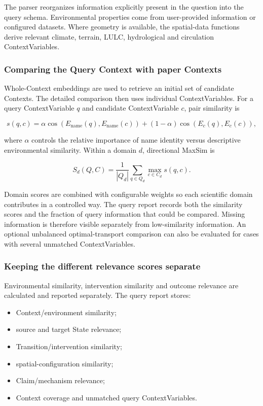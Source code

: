\documentclass[10pt,twocolumn]{article}
\begin{document}
The parser reorganizes information explicitly present in the question into the query schema. Environmental properties come from user-provided information or configured datasets. Where geometry is available, the spatial-data functions derive relevant climate, terrain, LULC, hydrological and circulation ContextVariables.

\subsubsection{Comparing the Query Context with paper Contexts}

Whole-Context embeddings are used to retrieve an initial set of candidate Contexts. The detailed comparison then uses individual ContextVariables. For a query ContextVariable $q$ and candidate ContextVariable $c$, pair similarity is

\begin{equation}
 s(q,c)=\alpha\cos(E_{\mathrm{name}}(q),E_{\mathrm{name}}(c))+(1-\alpha)\cos(E_c(q),E_c(c)),
\end{equation}

where $\alpha$ controls the relative importance of name identity versus descriptive environmental similarity. Within a domain $d$, directional MaxSim is

\begin{equation}
S_d(Q,C)=\frac{1}{|Q_d|}\sum_{q\in Q_d}\max_{c\in C_d}s(q,c).
\end{equation}

Domain scores are combined with configurable weights so each scientific domain contributes in a controlled way. The query report records both the similarity scores and the fraction of query information that could be compared. Missing information is therefore visible separately from low-similarity information. An optional unbalanced optimal-transport comparison can also be evaluated for cases with several unmatched ContextVariables.

\subsubsection{Keeping the different relevance scores separate}

Environmental similarity, intervention similarity and outcome relevance are calculated and reported separately. The query report stores:

\begin{itemize}
  \item Context/environment similarity;
  \item source and target State relevance;
  \item Transition/intervention similarity;
  \item spatial-configuration similarity;
  \item Claim/mechanism relevance;
  \item Context coverage and unmatched query ContextVariables.
\end{itemize}
\end{document}
